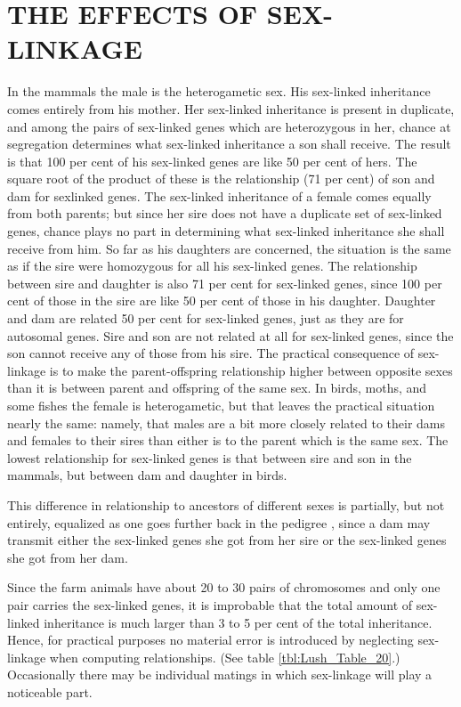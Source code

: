 \section*{THE EFFECTS OF SEX-LINKAGE}
\label{page255}

In the mammals the male is the heterogametic sex. His sex-linked
inheritance comes entirely from his mother. Her sex-linked inheritance
is present in duplicate, and among the pairs of sex-linked genes which
are heterozygous in her, chance at segregation determines what sex-linked
inheritance a son shall receive. The result is that 100 per cent of
his sex-linked genes are like 50 per cent of hers. The square root of the
product of these is the relationship (71 per cent) of son and dam for sexlinked
genes. The sex-linked inheritance of a female comes equally
from both parents; but since her sire does not have a duplicate set of
sex-linked genes, chance plays no part in determining what sex-linked
inheritance she shall receive from him. So far as his daughters are concerned,
the situation is the same as if the sire were homozygous for all
his sex-linked genes. The relationship between sire and daughter is also
71 per cent for sex-linked genes, since 100 per cent of those in the sire
are like 50 per cent of those in his daughter. Daughter and dam are
related 50 per cent for sex-linked genes, just as they are for autosomal
genes. Sire and son are not related at all for sex-linked genes, since the
son cannot receive any of those from his sire. The practical consequence
of sex-linkage is to make the parent-offspring relationship higher
between opposite sexes than it is between parent and offspring of the
same sex. In birds, moths, and some fishes the female is heterogametic,
but that leaves the practical situation nearly the same: namely, that
males are a bit more closely related to their dams and females to their
sires than either is to the parent which is the same sex. The lowest relationship
for sex-linked genes is that between sire and son in the mammals,
but between dam and daughter in birds.

This difference in relationship to ancestors of different sexes is
partially, but not entirely, equalized as one goes further back in the
pedigree , since a dam may transmit either the sex-linked genes she got
from her sire or the sex-linked genes she got from her dam.

Since the farm animals have about 20 to 30 pairs of chromosomes
and only one pair carries the sex-linked genes, it is improbable that the
total amount of sex-linked inheritance is much larger than 3 to 5 per
cent of the total inheritance. Hence, for practical purposes no material
error is introduced by neglecting sex-linkage when computing relationships.
(See table \ref{tbl:Lush_Table_20}.) Occasionally there may be individual matings in
which sex-linkage will play a noticeable part.

